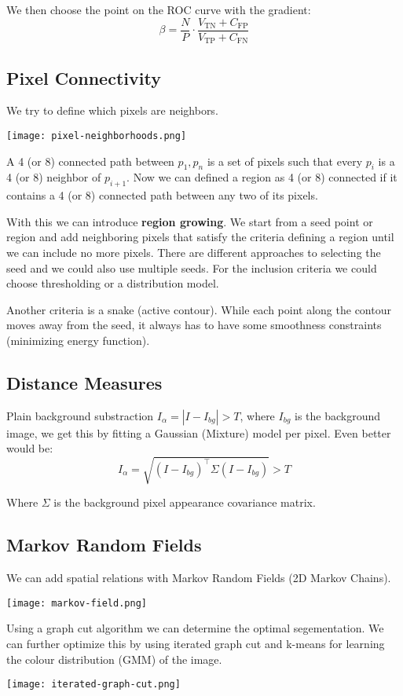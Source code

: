 We then choose the point on the ROC curve with the gradient:
$$\beta = \frac{N}{P} \cdot \frac{V_{\text{TN}} + C_{\text{FP}}}{V_{\text{TP}} + C_{\text{FN}}}$$


\subsection{Pixel Connectivity}

We try to define which pixels are neighbors.

\begin{center}
	\texttt{[image: pixel-neighborhoods.png]}
\end{center}

A 4 (or 8) connected path between $p_1, p_n$ is a set of pixels such that every $p_i$ is a 4 (or 8) neighbor of $p_{i+1}$. Now we can defined a region as 4 (or 8) connected if it contains a 4 (or 8) connected path between any two of its pixels.

With this we can introduce \textbf{region growing}. We start from a seed point or region and add neighboring pixels that satisfy the criteria defining a region until we can include no more pixels. There are different approaches to selecting the seed and we could also use multiple seeds. For the inclusion criteria we could choose thresholding or a distribution model.

Another criteria is a snake (active contour). While each point along the contour moves away from the seed, it always has to have some smoothness constraints (minimizing energy function).


\subsection{Distance Measures}

Plain background substraction $I_\alpha = |I - I_{bg}| > T$, where $I_{bg}$ is the background image, we get this by fitting a Gaussian (Mixture) model per pixel. Even better would be:
$$I_\alpha = \sqrt{(I - I_{bg})^\top \Sigma (I - I_{bg})} > T$$

Where $\Sigma$ is the background pixel appearance covariance matrix.


\subsection{Markov Random Fields}

We can add spatial relations with Markov Random Fields (2D Markov Chains).

\begin{center}
	\texttt{[image: markov-field.png]}
\end{center}

Using a graph cut algorithm we can determine the optimal segementation. We can further optimize this by using iterated graph cut and k-means for learning the colour distribution (GMM) of the image.

\begin{center}
	\texttt{[image: iterated-graph-cut.png]}
\end{center}